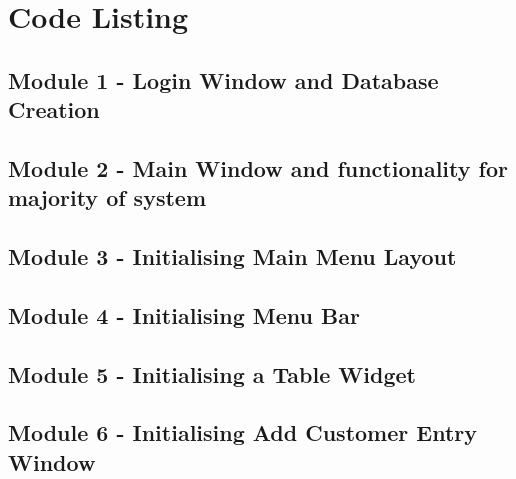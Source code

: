 \section{Code Listing}
\begin{landscape}
\begin{scriptsize}
\subsection{Module 1 - Login Window and Database Creation} \label{ssec:LoginDB.py}


\subsection{Module 2 - Main Window and functionality for majority of system} \label{ssec:MainMenu.py}


\subsection{Module 3 - Initialising Main Menu Layout}


\subsection{Module 4 - Initialising Menu Bar}


\subsection{Module 5 - Initialising a Table Widget}


\subsection{Module 6 - Initialising Add Customer Entry Window}

 \label{ssec:AddEntryWindow.py}


\end{scriptsize}
\end{landscape}
